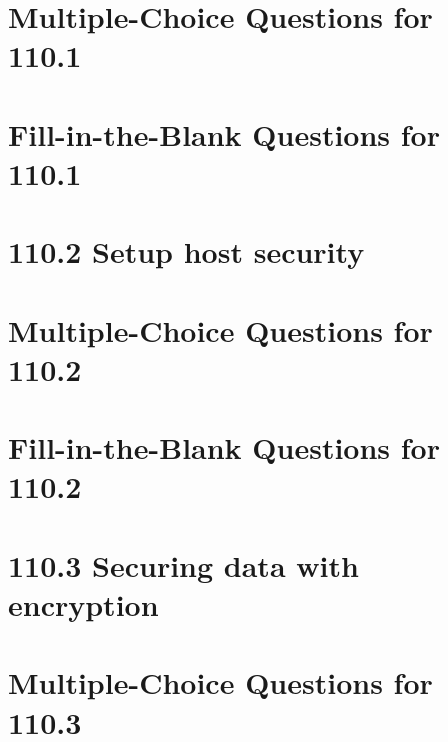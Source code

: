 \documentclass[a4paper]{report}
\begin{document}
\section*{Multiple-Choice Questions for 110.1}

\newpage
\section*{Fill-in-the-Blank Questions for 110.1}

\newpage
\section*{110.2 Setup host security}

\newpage
\section*{Multiple-Choice Questions for 110.2}

\newpage
\section*{Fill-in-the-Blank Questions for 110.2}

\newpage
\section*{110.3 Securing data with encryption}

\newpage
\section*{Multiple-Choice Questions for 110.3}
\end{document}
